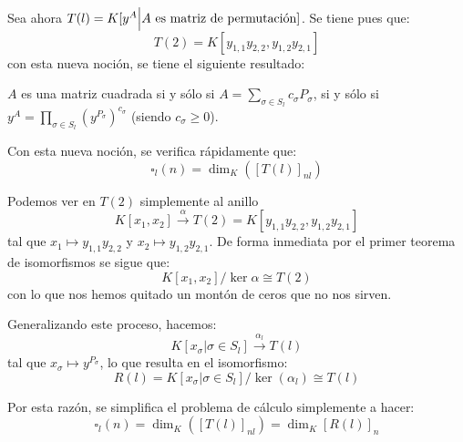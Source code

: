 \documentclass[12pt]{report}
\newcounter{it}
\theoremstyle{largebreak}
\begin{document}
    Sea ahora $T(l)=K[y^A\Big|A\textup{ es matriz de permutación}]$. Se tiene pues que:
    \begin{equation*}
        T(2)=K[ y_{ 1,1}y_{ 2,2},y_{ 1,2}y_{ 2,1}]
    \end{equation*}
    con esta nueva noción, se tiene el siguiente resultado:
    \begin{propo}
        $A$ es una matriz cuadrada si y sólo si $A=\sum_{ \sigma\in S_l}c_\sigma P_\sigma$, si y sólo si $y^A=\prod_{\sigma\in S_l}(y^{ P_\sigma})^{ c_\sigma}$ (siendo $c_\sigma\geq0$).
    \end{propo}

    Con esta nueva noción, se verifica rápidamente que:
    \begin{equation*}
        \square_l(n)=\dim_K([T(l)]_{ nl})
    \end{equation*}

    \begin{exa}
        Podemos ver en $T(2)$ simplemente al anillo
        \begin{equation*}
            K[x_1,x_2]\overset{\alpha}{\rightarrow}T(2)=K[y_{ 1,1}y_{ 2,2},y_{ 1,2}y_{ 2,1}]
        \end{equation*}
        tal que $x_1\mapsto y_{ 1,1}y_{ 2,2}$ y $x_2\mapsto y_{ 1,2}y_{ 2,1}$. De forma inmediata por el primer teorema de isomorfismos se sigue que:
        \begin{equation*}
            K[x_1,x_2]/\ker\alpha\cong T(2)
        \end{equation*}
        con lo que nos hemos quitado un montón de ceros que no nos sirven.
    \end{exa}

    \begin{obs}
        Generalizando este proceso, hacemos:
        \begin{equation*}
            K[x_\sigma\Big|\sigma\in S_l]\overset{\alpha_l}{\rightarrow}T(l)
        \end{equation*}
        tal que $x_\sigma\mapsto y^{ P_\sigma}$, lo que resulta en el isomorfismo:
        \begin{equation*}
            R(l)=K[x_\sigma\Big|\sigma\in S_l]/\ker(\alpha_l)\cong T(l)
        \end{equation*}
    \end{obs}

    Por esta razón, se simplifica el problema de cálculo simplemente a hacer:
    \begin{equation*}
        \square_l(n)=\dim_K([T(l)]_{ nl})=\dim_K[R(l)]_n
    \end{equation*}
\end{document}
